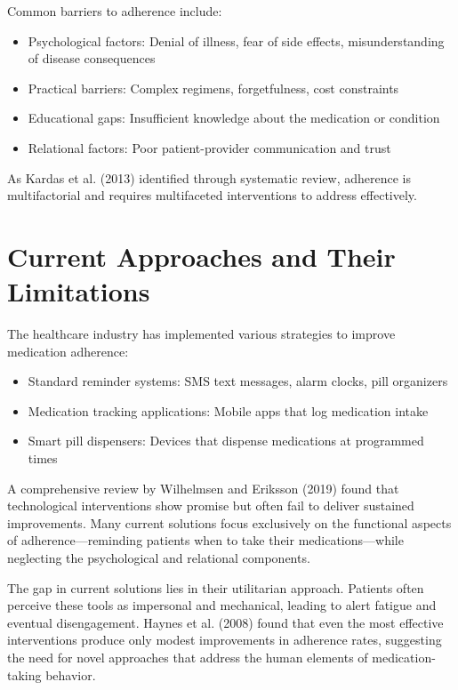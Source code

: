 \documentclass[sigconf]{acmart}
\begin{document}
Common barriers to adherence include:

\begin{itemize}
  \item Psychological factors: Denial of illness, fear of side effects, misunderstanding of disease consequences
  \item Practical barriers: Complex regimens, forgetfulness, cost constraints
  \item Educational gaps: Insufficient knowledge about the medication or condition
  \item Relational factors: Poor patient-provider communication and trust
\end{itemize}

As Kardas et al. (2013)\cite{Kardas2013} identified through systematic review, adherence is multifactorial and requires multifaceted interventions to address effectively.

\section{Current Approaches and Their Limitations}

The healthcare industry has implemented various strategies to improve medication adherence:

\begin{itemize}
  \item Standard reminder systems: SMS text messages, alarm clocks, pill organizers
  \item Medication tracking applications: Mobile apps that log medication intake
  \item Smart pill dispensers: Devices that dispense medications at programmed times
\end{itemize}

A comprehensive review by Wilhelmsen and Eriksson (2019)\cite{Wilhelmsen2019} found that technological interventions show promise but often fail to deliver sustained improvements. Many current solutions focus exclusively on the functional aspects of adherence—reminding patients when to take their medications—while neglecting the psychological and relational components.

The gap in current solutions lies in their utilitarian approach. Patients often perceive these tools as impersonal and mechanical, leading to alert fatigue and eventual disengagement. Haynes et al. (2008)\cite{Haynes2008} found that even the most effective interventions produce only modest improvements in adherence rates, suggesting the need for novel approaches that address the human elements of medication-taking behavior.
\end{document}
